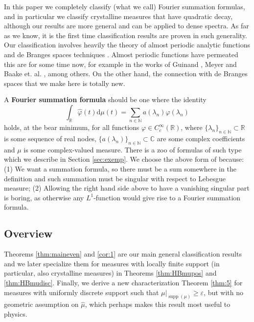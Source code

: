 \documentclass[a4paper,reqno,12pt]{amsart}
\DeclareMathOperator{\supp}{\mathrm{supp}}
\newcommand{\n}{\mathbb{N}}
\renewcommand{\r}{\mathbb{R}}
\newcommand{\cp}{\mathbb{C}} %
\newcommand{\ft}{\widehat}
\newcommand{\la}{\lambda}
\newcommand{\ep}{\varepsilon}
\newcommand{\p}{\varphi}
\renewcommand{\d}{\mathrm{d}}
\newcommand{\1}{{\bf 1}}
\renewcommand{\emph}[1]{{\bf #1}}
\renewcommand{\1}{{\bo 1}}
\begin{document}
In this paper we completely classify (what we call) Fourier summation formulas, and in particular we classify crystalline measures that have quadratic decay, although our results are more general and can be applied to dense spectra. As far as we know, it is the first time classification results are proven in such generality.  Our classification involves heavily the theory of almost periodic analytic functions \cite{Be} and de Branges spaces techniques \cite{dB}. Almost periodic functions have permeated this are for some time now, for example in the works of Guinand \cite{Gui}, Meyer \cite{Me12} and Baake et. al. \cite{BS, BG2, BST}, among others. On the other hand, the connection with de Branges spaces that we make  here is totally new.

A \emph{Fourier summation formula} should be one where the identity
$$
\int_\r \ft \p(t)\d\mu(t) = \sum_{n\in \n} a(\la_n)\p(\la_n)
$$
holds, at the bear minimum, for all functions $\p \in C^\infty_c(\r)$, where $\{\la_n\}_{n\in \n}\subset \r$ is some sequence of real nodes, $\{a(\la_n)\}_{n\in \n}\subset \cp$ are some complex coefficients and  $\mu$ is some complex-valued measure. There is a zoo of formulas of such type which we describe in Section \ref{sec:exemp}. We choose the above form of because: (1) We want a summation formula, so there must be a sum somewhere in the definition and such summation must be singular with respect to Lebesgue measure; (2)  Allowing the right hand side above to have a vanishing singular part is boring, as otherwise any $L^1$-function would give rise to a Fourier summation formula. 
\vspace{-1mm}
\subsection{Overview} Theorems \ref{thm:maineven} and \ref{cor:1} are our main general classification results and we later specialize them for measures with locally finite support (in particular, also crystalline measures) in Theorems \ref{thm:HBmupos} and \ref{thm:HBmudisc}. Finally, we derive a new characterization Theorem \ref{thm:5} for measures with uniformly discrete support such that $\mu|_{\supp(\mu)}\geq \ep$, but with no geometric assumption on $\ft \mu$, which perhaps makes this result most useful to physics.
\end{document}
